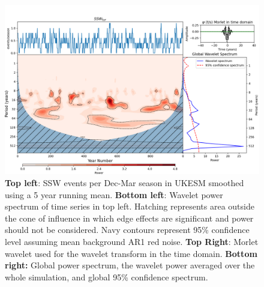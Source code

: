 \begin{figure}[h!]
\begin{center}
\noindent\includegraphics[width = 0.8\linewidth]{Figures/Figures-origins/SSW_wavelet_5_yr_wavelet.png}
\caption{\textbf{Top left}: SSW events per Dec-Mar season in UKESM smoothed using a 5 year running mean. \textbf{Bottom left}: Wavelet power spectrum of time series in top left. Hatching represents area outside the cone of influence in which edge effects are significant and power should not be considered. Navy contours represent 95\% confidence level assuming mean background AR1 red noise. \textbf{Top Right}: Morlet wavelet used for the wavelet transform in the time domain. \textbf{Bottom right:} Global power spectrum, the wavelet power averaged over the whole simulation, and global 95\% confidence spectrum.}
\label{fig:SSW_series_5yr_wavelet}
\end{center}
\end{figure}

